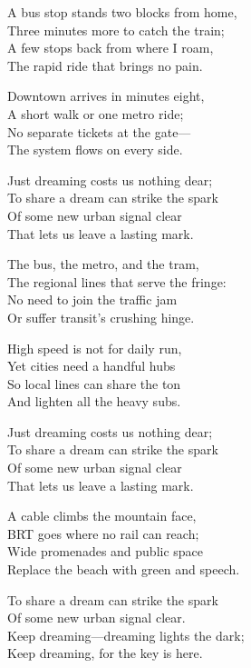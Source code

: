 \begin{lyrics}
A bus stop stands two blocks from home,\\
Three minutes more to catch the train;\\
A few stops back from where I roam,\\
The rapid ride that brings no pain.

Downtown arrives in minutes eight,\\
A short walk or one metro ride;\\
No separate tickets at the gate—\\
The system flows on every side.

Just dreaming costs us nothing dear;\\
To share a dream can strike the spark\\
Of some new urban signal clear\\
That lets us leave a lasting mark.

The bus, the metro, and the tram,\\
The regional lines that serve the fringe:\\
No need to join the traffic jam\\
Or suffer transit’s crushing hinge.

High speed is not for daily run,\\
Yet cities need a handful hubs\\
So local lines can share the ton\\
And lighten all the heavy subs.

Just dreaming costs us nothing dear;\\
To share a dream can strike the spark\\
Of some new urban signal clear\\
That lets us leave a lasting mark.

A cable climbs the mountain face,\\
BRT goes where no rail can reach;\\
Wide promenades and public space\\
Replace the beach with green and speech.

To share a dream can strike the spark\\
Of some new urban signal clear.\\
Keep dreaming—dreaming lights the dark;\\
Keep dreaming, for the key is here.
\end{lyrics}

